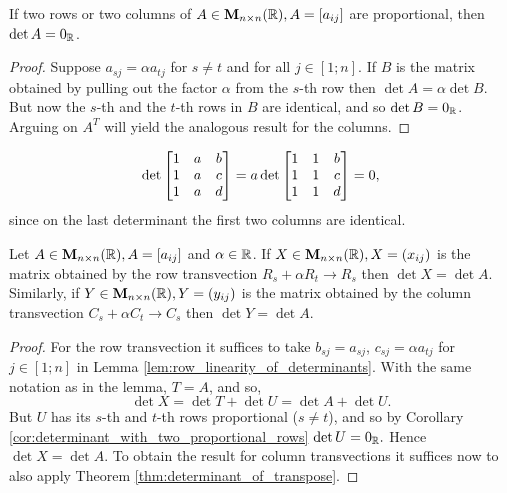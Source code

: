 \begin{cor}
If two rows or two columns of $A \in {\mathbf M}_{n\times n}( \mathbb{R}), A =
[a_{ij}]$ are proportional, then $\det A = 0_{\mathbb{R}}$.
\label{cor:determinant_with_two_proportional_rows}\end{cor}
\begin{proof}
Suppose $a_{sj} = \alpha a_{tj}$ for $s\neq t$ and for all $j\in
[1;n]$. If $B$ is the matrix obtained by pulling out the factor
$\alpha$ from the $s$-th row then $\det A = \alpha \det B$. But now
the $s$-th and the $t$-th rows in $B$ are identical, and so $\det B
= 0_{\mathbb{R}}$. Arguing on $A^T$ will yield the analogous result for
the columns.

\end{proof}
\begin{exa}
$$\det \begin{bmatrix} 1 & a & b \cr 1 & a & c \cr 1 & a & d \cr   \end{bmatrix} =
a\det \begin{bmatrix} 1 & 1 & b \cr 1 & 1 & c \cr 1 & 1 & d \cr
\end{bmatrix} = 0,  $$since on the last determinant the first two columns are
identical.

\end{exa}

 \begin{thm}\label{thm:multilinearity_of_determinants}
Let $A \in {\mathbf M}_{n\times n}( \mathbb{R}), A = [a_{ij}]$ and $\alpha\in
\mathbb{R}$. If $X \in {\mathbf M}_{n\times n}( \mathbb{R}), X = (x_{ij})$ is the
matrix obtained by the row transvection  $R_s + \alpha R_t
\rightarrow R_s$ then $\det X = \det A$. Similarly, if $Y \in
{\mathbf M}_{n\times n}( \mathbb{R}), Y = (y_{ij})$ is the matrix obtained by the
column transvection  $C_s + \alpha C_t \rightarrow C_s$ then $\det Y
= \det A$.
 \end{thm}
 \begin{proof}
For the row transvection it suffices to take $b_{sj} = a_{sj}$,
$c_{sj} = \alpha a_{tj}$ for $j\in [1;n]$ in Lemma
\ref{lem:row_linearity_of_determinants}. With the same notation as
in the lemma, $T = A$, and so, $$\det X = \det T + \det U = \det A
+ \det U.
$$But $U$ has its $s$-th and $t$-th rows proportional ($s\neq t$),
and so by Corollary \ref{cor:determinant_with_two_proportional_rows}
$\det U = 0_{\mathbb{R}}.$ Hence $\det X = \det A.$ To obtain the result
for column transvections it suffices now to also apply Theorem
\ref{thm:determinant_of_transpose}.
 \end{proof}


